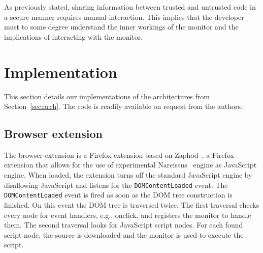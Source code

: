 \documentclass{llncs}
\begin{document}
As previously stated, sharing information 
between trusted and untrusted code in a secure manner requires manual interaction. 
This implies that the developer must to some degree understand the inner workings of the monitor
and the implications of interacting with the monitor.


\vspace{-.4cm}
\section{Implementation}
\label{sec:impl}
\vspace{-.2cm}

This section details our implementations of the architectures
from Section~\ref{sec:arch}. The code is readily available on request
from the authors.


\vspace{-.4cm}
\subsection{Browser extension}
\vspace{-.2cm}


The browser extension is a Firefox extension based on Zaphod~\cite{Zaphod}, a
Firefox extension that allows for the use of experimental
Narcissus~\cite{Narcissus} engine as JavaScript engine.  
%
When loaded, the extension turns off the standard JavaScript engine by
disallowing JavaScript and listens for the \lstinline{DOMContentLoaded} event.
The \lstinline{DOMContentLoaded} event is fired as soon as the DOM tree
construction is finished.  On this event the DOM tree is traversed twice. The
first traversal checks every node for event handlers, e.g., onclick, and
registers the monitor to handle them. The second traversal looks for JavaScript
script nodes.  For each found script node, the source is downloaded and the
monitor is used to execute the script.
\end{document}
